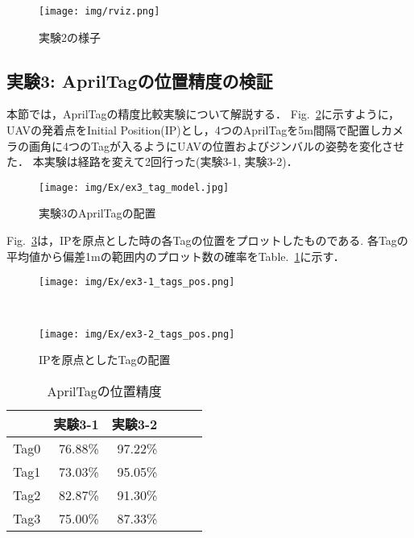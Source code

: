 \documentclass[a4j,fleqn,dvipdfmx,uplatex]{jsarticle}
\newcommand{\figref}[1]{Fig.\ \ref{#1}}
\newcommand{\tableref}[1]{Table.\ \ref{#1}}
\begin{document}
\begin{figure}[tb]
    \centering
    \texttt{[image: img/rviz.png]}
    \caption{実験2の様子}
    \label{fig:ex2}
\end{figure}

\subsection{実験3: AprilTagの位置精度の検証}\label{subsec:ex3}
本節では，AprilTagの精度比較実験について解説する．
\figref{fig:ex3_tags}に示すように，UAVの発着点をInitial Position(IP)とし，4つのAprilTagを5m間隔で配置しカメラの画角に4つのTagが入るようにUAVの位置およびジンバルの姿勢を変化させた．
本実験は経路を変えて2回行った(実験3-1, 実験3-2)．

\begin{figure}[tb]
    \centering
    \texttt{[image: img/Ex/ex3\_tag\_model.jpg]}
    \caption{実験3のAprilTagの配置}
    \label{fig:ex3_tags}
\end{figure}

\figref{fig:ex3}は，IPを原点とした時の各Tagの位置をプロットしたものである. 各Tagの平均値から偏差1mの範囲内のプロット数の確率を\tableref{table:tag_pos}に示す．


\begin{figure}[tbp]
\centering
\begin{minipage}[b]{\hsize}
    \centering
    \texttt{[image: img/Ex/ex3-1\_tags\_pos.png]}
\end{minipage}\\
\begin{minipage}[b]{\hsize}
    \centering
    \texttt{[image: img/Ex/ex3-2\_tags\_pos.png]}
\end{minipage}
\caption{IPを原点としたTagの配置}
\label{fig:ex3}
\end{figure}

\begin{table}[h]
\caption{AprilTagの位置精度}
\label{table:tag_pos}
\centering
\begin{tabular}{lrrrrr}
    & 実験3-1 & 実験3-2 \\
    \hline \hline
    Tag0 & 76.88\% & 97.22\% \\
    Tag1 & 73.03\% & 95.05\% \\
    Tag2 & 82.87\% & 91.30\% \\
    Tag3 & 75.00\% & 87.33\% \\
    \hline
\end{tabular}
\end{table}
\end{document}

